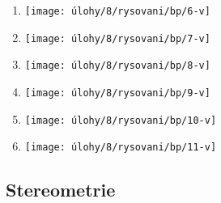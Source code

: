 \begin{enumerate}
\begin{minipage}[t]{\linewidth}
    \end{minipage}

    \item
    \begin{minipage}[t]{\linewidth}
        \begin{quote}
            \phantom{text}
        \end{quote}
        \centering
        \texttt{[image: úlohy/8/rysovani/bp/6-v]}

    \end{minipage}

    \item
    \begin{minipage}[t]{\linewidth}
        \begin{quote}
            \phantom{text}
        \end{quote}
        \centering
        \texttt{[image: úlohy/8/rysovani/bp/7-v]}

    \end{minipage}

    \item
    \begin{minipage}[t]{\linewidth}
        \begin{quote}
            \phantom{text}
        \end{quote}
        \centering
        \texttt{[image: úlohy/8/rysovani/bp/8-v]}

    \end{minipage}

    \item
    \begin{minipage}[t]{\linewidth}
        \begin{quote}
            \phantom{text}
        \end{quote}
        \centering
        \texttt{[image: úlohy/8/rysovani/bp/9-v]}

    \end{minipage}

    \item
    \begin{minipage}[t]{\linewidth}
        \begin{quote}
            \phantom{text}
        \end{quote}
        \centering
        \texttt{[image: úlohy/8/rysovani/bp/10-v]}

    \end{minipage}

    \item
    \begin{minipage}[t]{\linewidth}
        \begin{quote}
            \phantom{text}
        \end{quote}
        \centering
        \texttt{[image: úlohy/8/rysovani/bp/11-v]}

    \end{minipage}
\end{enumerate}


\newpage

\subsection{Stereometrie}
\label{subsec:stereometrie}